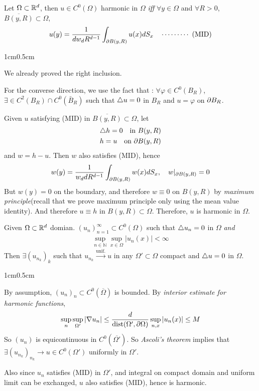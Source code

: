 \documentclass[12pt,a4paper]{article}
\newenvironment{proof}
{\begin{changemargin}{1cm}{0.5cm} 
	}%
	{\end{changemargin}
}
\newenvironment{p}
{\begin{proof} 
	}%
	{\end{proof}
}
\begin{document}
 Let $\Omega \subset \mathbb{R}^d$, then $u\in C^0(\Omega)$ harmonic in $\Omega$ \emph{iff} $\forall y\in \Omega$ and $\forall R>0$, $\overline{B(y, R)}\subset \Omega$,
\begin{align*}
u(y) = \frac{1}{dw_d R^{d-1}} \int_{\partial B(y, R)}u(x) dS_x \quad \cdots\cdots\cdots\,\,(\text{MID})
\end{align*}
\begin{p}
\pf We already proved the right inclusion.
\s

For the converse direction, we use the fact that : $\forall \varphi \in C^0(B_R)$, $\exists \in C^2(B_R) \cap C^0(\bar{B}_R)$ such that $\triangle u =0$ in $B_R$ and $u= \varphi$ on $\partial B_R$.

\quad Given $u$ satisfying (MID) in $\overline{B(y, R)}\subset \Omega$, let
\begin{align*}
&\triangle h =0 \quad \text{in }B(y, R)\\
& h = u \quad \text{on } \partial B(y, R)
\end{align*}
and $w = h- u$. Then $w$ also satisfies (MID), hence
\begin{align*}
w(y) = \frac{1}{w_d d R^{d-1}} \int_{\partial B(y,R) }w(x)dS_x, \quad w|_{\partial B(y, R)}=0
\end{align*}
But $w(y) = 0$ on the boundary, and therefore $w\equiv 0$ on $B(y,R)$ by \emph{maximum principle}(recall that we prove maximum principle only using the mean value identity). And therefore $u\equiv h$ in $B(y, R) \subset \Omega$. Therefore, $u$ is harmonic in $\Omega$.

\eop
\end{p}
\s

 Given $\Omega \subset \mathbb{R}^d$ domian. $(u_n)_{n=1}^{\infty} \subset C^0(\Omega)$ such that $\triangle u_n =0$ in $\Omega$ \emph{and}
\begin{align*}
\sup_{n\in \mathbb{N}} \sup_{x\in \Omega} |u_n(x)| < \infty
\end{align*}
Then $\exists (u_{n_k})_k$ such that $u_{n_k} \xrightarrow{\text{unif.}} u$ in any $\Omega' \subset \Omega$ compact and $\triangle u=0$ in $\Omega$.
\begin{p}
\pf By assumption, $(u_n)_n \subset C^0(\overline{\Omega})$ is bounded. By \emph{interior estimate for harmonic functions},
\begin{align*}
\sup_n \sup_{\Omega '} |\nabla u_n| \leq \frac{d}{\text{dist}(\Omega', \partial \Omega)} \sup_{n,x} |u_n(x)| \leq M
\end{align*} 
So $(u_n)$ is equicontinuous in $C^0(\overline{\Omega'})$. So \emph{Ascoli's theorem} implies that $\exists (u_{n_k})_{n_k} \rightarrow u \in C^0(\Omega')$ uniformly in $\Omega'$.

\quad Also since $u_n$ satisfies (MID) in $\Omega'$, and integral on compact domain and uniform limit can be exchanged, $u$ also satisfies (MID), hence is harmonic.

\eop 
\end{p}
\s
\end{document}
